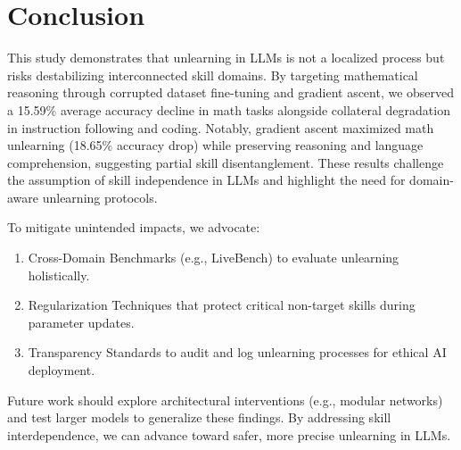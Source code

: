 \documentclass[10.5pt]{article}
\begin{document}
\section{Conclusion}
This study demonstrates that unlearning in LLMs is not a localized process but risks destabilizing interconnected skill domains. By targeting mathematical reasoning through corrupted dataset fine-tuning and gradient ascent, we observed a 15.59\% average accuracy decline in math tasks alongside collateral degradation in instruction following and coding. Notably, gradient ascent maximized math unlearning (18.65\% accuracy drop) while preserving reasoning and language comprehension, suggesting partial skill disentanglement. These results challenge the assumption of skill independence in LLMs and highlight the need for domain-aware unlearning protocols.

To mitigate unintended impacts, we advocate:
\begin{enumerate}
    \item Cross-Domain Benchmarks (e.g., LiveBench) to evaluate unlearning holistically.
    \item Regularization Techniques that protect critical non-target skills during parameter updates.
    \item Transparency Standards to audit and log unlearning processes for ethical AI deployment.
\end{enumerate}
Future work should explore architectural interventions (e.g., modular networks) and test larger models to generalize these findings. By addressing skill interdependence, we can advance toward safer, more precise unlearning in LLMs.




\end{document}
